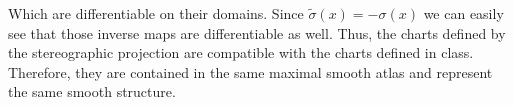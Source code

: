 \documentclass[a4paper]{article}
\begin{document}
Which are differentiable on their domains. Since $\tilde{\sigma}(x) = -\sigma(x)$ we can easily see that those inverse maps are differentiable as well. Thus, the charts defined by the stereographic projection are compatible with the charts defined in class. Therefore, they are contained in the same maximal smooth atlas and represent the same smooth structure.
\end{document}
